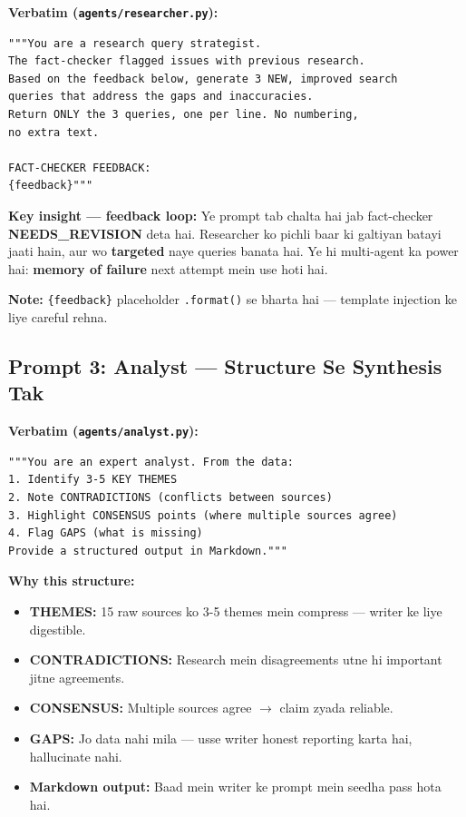 \begin{codestorybox}
\textbf{Verbatim (\texttt{agents/researcher.py}):}

\begin{lstlisting}[style=pythonstyle, caption={REVISION\_PROMPT}]
"""You are a research query strategist.
The fact-checker flagged issues with previous research.
Based on the feedback below, generate 3 NEW, improved search
queries that address the gaps and inaccuracies.
Return ONLY the 3 queries, one per line. No numbering,
no extra text.

FACT-CHECKER FEEDBACK:
{feedback}"""
\end{lstlisting}

\textbf{Key insight --- feedback loop:} Ye prompt tab chalta hai jab fact-checker \textbf{NEEDS\_REVISION} deta hai. Researcher ko pichli baar ki galtiyan batayi jaati hain, aur wo \textbf{targeted} naye queries banata hai. Ye hi multi-agent ka power hai: \textbf{memory of failure} next attempt mein use hoti hai.

\textbf{Note:} \texttt{\{feedback\}} placeholder \texttt{.format()} se bharta hai --- template injection ke liye careful rehna.
\end{codestorybox}

\subsection{Prompt 3: Analyst --- Structure Se Synthesis Tak}

\begin{codestorybox}
\textbf{Verbatim (\texttt{agents/analyst.py}):}

\begin{lstlisting}[style=pythonstyle, caption={Analyst SYSTEM\_PROMPT}]
"""You are an expert analyst. From the data:
1. Identify 3-5 KEY THEMES
2. Note CONTRADICTIONS (conflicts between sources)
3. Highlight CONSENSUS points (where multiple sources agree)
4. Flag GAPS (what is missing)
Provide a structured output in Markdown."""
\end{lstlisting}

\textbf{Why this structure:}
\begin{itemize}
\item \textbf{THEMES:} 15 raw sources ko 3-5 themes mein compress --- writer ke liye digestible.
\item \textbf{CONTRADICTIONS:} Research mein disagreements utne hi important jitne agreements.
\item \textbf{CONSENSUS:} Multiple sources agree $\rightarrow$ claim zyada reliable.
\item \textbf{GAPS:} Jo data nahi mila --- usse writer honest reporting karta hai, hallucinate nahi.
\item \textbf{Markdown output:} Baad mein writer ke prompt mein seedha pass hota hai.
\end{itemize}
\end{codestorybox}

